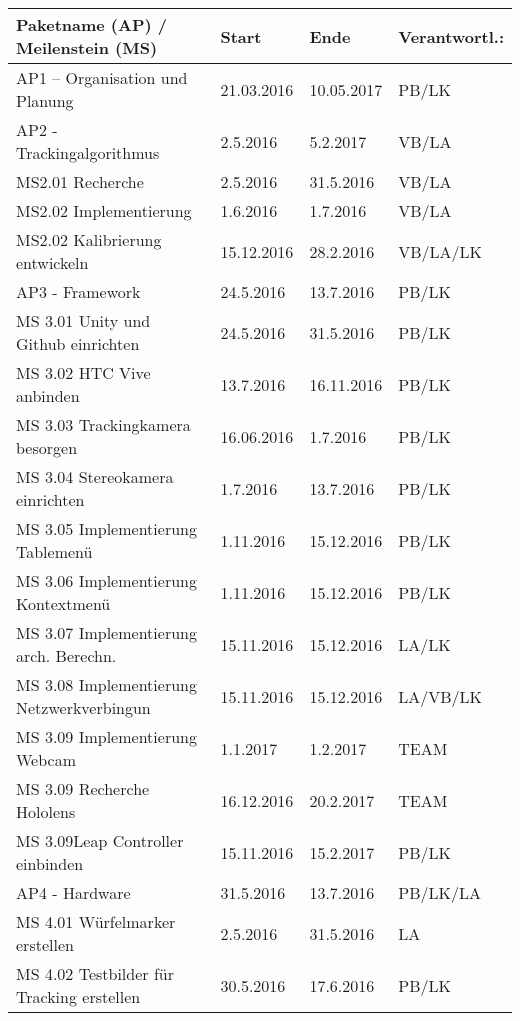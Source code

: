 \begin{table}
	\centering
	\begin{tabular}{|l|l|l|l|}
		\hline
		\Absatzbox{}
		\textbf{Paketname (AP) / Meilenstein (MS)}& \textbf{Start} &  \textbf{Ende} &  \textbf{Verantwortl.:} \\
		\hline
		AP1 – Organisation und Planung & 21.03.2016 & 10.05.2017 & PB/LK\\		
  		\hline
		AP2 - Trackingalgorithmus & 2.5.2016 & 5.2.2017 & VB/LA\\
		\hline
		MS2.01 Recherche  & 2.5.2016 & 31.5.2016 & VB/LA\\
 	 	\hline
		MS2.02 Implementierung  & 1.6.2016 & 1.7.2016 & VB/LA\\
		\hline
		MS2.02 Kalibrierung entwickeln  & 15.12.2016 & 28.2.2016 & VB/LA/LK\\
		\hline
		AP3 - Framework  & 24.5.2016 & 13.7.2016 & PB/LK\\
		\hline
		MS 3.01 Unity und Github einrichten  & 24.5.2016 & 31.5.2016 & PB/LK\\
		\hline
		MS 3.02 HTC Vive anbinden & 13.7.2016 & 16.11.2016 & PB/LK\\
		\hline
		MS 3.03 Trackingkamera besorgen &16.06.2016 & 1.7.2016 & PB/LK\\
		\hline
		MS  3.04 Stereokamera einrichten &1.7.2016 & 13.7.2016 & PB/LK\\
		\hline
		MS  3.05 Implementierung Tablemenü &1.11.2016 & 15.12.2016 & PB/LK\\
		\hline
		MS  3.06 Implementierung Kontextmenü &1.11.2016 & 15.12.2016 & PB/LK\\
		\hline
		MS  3.07 Implementierung arch. Berechn. &15.11.2016 & 15.12.2016 & LA/LK\\
		\hline
		MS 3.08 Implementierung Netzwerkverbingun &15.11.2016 & 15.12.2016 & LA/VB/LK\\
		\hline
		MS 3.09 Implementierung Webcam &1.1.2017 & 1.2.2017 & TEAM\\
		\hline
		MS 3.09 Recherche Hololens  &16.12.2016 & 20.2.2017 & TEAM\\
		\hline
		MS 3.09Leap Controller einbinden  &15.11.2016 & 15.2.2017 & PB/LK\\
		\hline
		AP4 - Hardware & 31.5.2016 & 13.7.2016 & PB/LK/LA\\
		\hline
		MS 4.01 Würfelmarker erstellen & 2.5.2016 & 31.5.2016 & LA\\
		\hline
		MS 4.02 Testbilder für Tracking erstellen  & 30.5.2016 & 17.6.2016 & PB/LK\\

\end{tabular}
\end{table}
